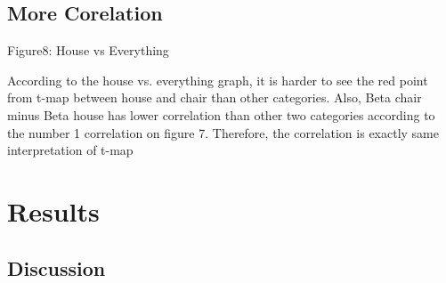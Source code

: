 \documentclass[11pt]{article}
\begin{document}
\begin{housevsface}
\subsection{More Corelation}

\begin{housevsface}
  \centering
    \caption{Figure8: House vs Everything}
           
According to the house vs. everything graph, it is harder to see the red point from t-map between house and chair than other categories. Also, Beta chair minus Beta house has lower correlation than other two categories according to the number 1 correlation on figure 7. Therefore,  the correlation is exactly same interpretation  of t-map
\end{housevsface}

\subsection{}



\section{Results}

\subsection{Discussion}


\end{housevsface}
\end{document}
